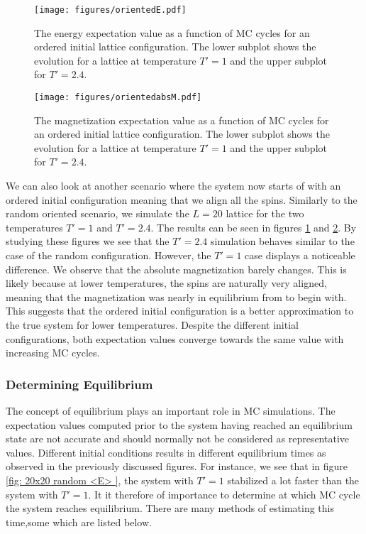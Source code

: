 \documentclass[a4paper, 10pt, reqno]{amsart}
\begin{document}
\begin{figure}
    \centering
    \texttt{[image: figures/orientedE.pdf]}
    \caption{The energy expectation value as a function of MC cycles for an ordered initial lattice configuration. The lower subplot shows the evolution for a lattice at temperature $T'=1$ and the upper subplot for $T'=2.4$.}
    \label{fig: 20x20 ordered <E> }
\end{figure}

\begin{figure}
    \centering
    \texttt{[image: figures/orientedabsM.pdf]}
    \caption{The magnetization expectation value as a function of MC cycles for an ordered initial lattice configuration. The lower subplot shows the evolution for a lattice at temperature $T'=1$ and the upper subplot for $T'=2.4$.}
    \label{fig: 20x20 ordered <absM> }
\end{figure}

We can also look at another scenario where the system now starts of with an ordered initial configuration meaning that we align all the spins. Similarly to the random oriented scenario, we simulate the $L=20$ lattice for the two temperatures $T' = 1$ and $T' = 2.4$. The results can be seen in figures \ref{fig: 20x20 ordered <E> } and \ref{fig: 20x20 ordered <absM> }. By studying these figures we see that the $T' = 2.4$ simulation behaves similar to the case of the random configuration. However, the $T' = 1$ case displays a noticeable difference. We observe that the absolute magnetization barely changes. This is likely because at lower temperatures, the spins are naturally very aligned, meaning that the magnetization was nearly in equilibrium from to begin with. This suggests that the ordered initial configuration is a better approximation to the true system for lower temperatures.
Despite the different initial configurations, both expectation values converge towards the same value with increasing MC cycles. 

\subsubsection{Determining Equilibrium}
The concept of equilibrium plays an important role in MC simulations. The expectation values computed prior to the system having reached an equilibrium state are not accurate and should normally not be considered as representative values. Different initial conditions results in different equilibrium times as observed in the previously discussed figures. For instance, we see that in figure \ref{fig: 20x20 random <E> }, the system with $T' =1$ stabilized a lot faster than the system with $T' = 1$. It it therefore of importance to determine at which MC cycle the system reaches equilibrium. There are many methods of estimating this time,some which are listed below.
\end{document}
